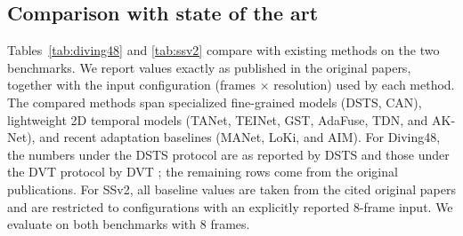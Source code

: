 \subsection{Comparison with state of the art}
\label{sec:main}

Tables~\ref{tab:diving48} and \ref{tab:ssv2} compare \dgtdm with existing
methods on the two benchmarks. We report values exactly as published in the
original papers, together with the input configuration (frames $\times$
resolution) used by each method. The compared methods span specialized
fine-grained models (DSTS, CAN), lightweight 2D temporal models (TANet,
TEINet, GST, AdaFuse, TDN, and AK-Net), and recent adaptation baselines
(MANet, LoKi, and AIM). For Diving48, the numbers under the DSTS protocol
are as reported by DSTS
\cite{li2022dsts} and those under the DVT protocol by DVT \cite{dvt2022}; the
remaining rows come from the original publications. For SSv2, all baseline values are taken from the cited original papers and
are restricted to configurations with an explicitly reported $8$-frame input.
We evaluate \dgtdm on both benchmarks with $8$ frames.

